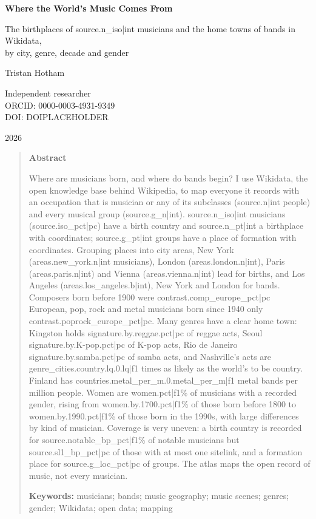 \documentclass[11pt,a4paper]{article}
\begin{document}
\begin{center}
{\Large\bfseries Where the World's Music Comes From\par}
\vspace{0.4em}
{\large The birthplaces of {{source.n_iso|int}} musicians and the home towns of bands in Wikidata,\\by city, genre, decade and gender\par}
\vspace{1.2em}
{\large Tristan Hotham\par}
\vspace{0.3em}
{\small Independent researcher\\
ORCID: 0000-0003-4931-9349\\
DOI: DOIPLACEHOLDER\par}
\vspace{0.8em}
2026
\end{center}

\begin{quote}
\small
\begin{center}\textbf{Abstract}\end{center}
Where are musicians born, and where do bands begin? I use Wikidata, the open knowledge base behind Wikipedia, to map everyone it records with an occupation that is musician or any of its subclasses ({{source.n|int}} people) and every musical group ({{source.g_n|int}}). {{source.n_iso|int}} musicians ({{source.iso_pct|pc}}) have a birth country and {{source.n_pt|int}} a birthplace with coordinates; {{source.g_pt|int}} groups have a place of formation with coordinates. Grouping places into city areas, New York ({{areas.new_york.n|int}} musicians), London ({{areas.london.n|int}}), Paris ({{areas.paris.n|int}}) and Vienna ({{areas.vienna.n|int}}) lead for births, and Los Angeles ({{areas.los_angeles.b|int}}), New York and London for bands. Composers born before 1900 were {{contrast.comp_europe_pct|pc}} European, pop, rock and metal musicians born since 1940 only {{contrast.poprock_europe_pct|pc}}. Many genres have a clear home town: Kingston holds {{signature.by.reggae.pct|pc}} of reggae acts, Seoul {{signature.by.K-pop.pct|pc}} of K-pop acts, Rio de Janeiro {{signature.by.samba.pct|pc}} of samba acts, and Nashville's acts are {{genre_cities.country.lq.0.lq|f1}} times as likely as the world's to be country. Finland has {{countries.metal_per_m.0.metal_per_m|f1}} metal bands per million people. Women are {{women.pct|f1}}\% of musicians with a recorded gender, rising from {{women.by.1700.pct|f1}}\% of those born before 1800 to {{women.by.1990.pct|f1}}\% of those born in the 1990s, with large differences by kind of musician. Coverage is very uneven: a birth country is recorded for {{source.notable_bp_pct|f1}}\% of notable musicians but {{source.sl1_bp_pct|pc}} of those with at most one sitelink, and a formation place for {{source.g_loc_pct|pc}} of groups. The atlas maps the open record of music, not every musician.

\textbf{Keywords:} musicians; bands; music geography; music scenes; genres; gender; Wikidata; open data; mapping
\end{quote}
\end{document}
